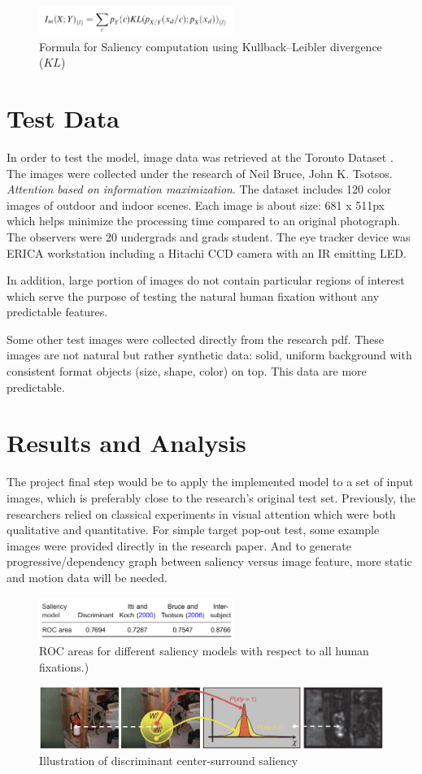 \documentclass[conference]{IEEEtran}
\begin{document}
\begin{figure}[h]
    \centering
    \includegraphics[width=2.5in]{KL.png}
    \caption{Formula for Saliency computation using Kullback–Leibler divergence ($KL$) }
    \label{fig:kl_formula}
\end{figure}

\section{Test Data}
In order to test the model, image data was retrieved at the Toronto Dataset \cite{MITBenchmark_2012}. The images were collected under the research of Neil Bruce, John K. Tsotsos. \textit{Attention based on information maximization}. The dataset includes 120 color images of outdoor and indoor scenes. Each image is about size: 681 x 511px which helps minimize the processing time compared to an original photograph. The observers were 20 undergrads and grads student. The eye tracker device was ERICA workstation including a Hitachi CCD camera with an IR emitting LED.

In addition, large portion of images do not contain particular regions of interest which serve the purpose of testing the natural human fixation without any predictable features. 

Some other test images were collected directly from the research pdf. These images are not natural but rather synthetic data: solid, uniform background with consistent format objects (size, shape, color) on top. This data are more predictable.

\section{Results and Analysis}
The project final step would be to apply the implemented model to a set of input images, which is preferably close to the research’s original test set. Previously, the researchers relied on classical experiments in visual attention which were both qualitative and quantitative. For simple target pop-out test, some example images were provided directly in the research paper. And to generate progressive/dependency graph between saliency versus image feature, more static and motion data will be needed. 

\begin{figure}[h]
    \centering
    \includegraphics[width=2.5in]{score.png}
    \caption{ROC areas for different saliency models with respect to all human fixations.) }
    \label{fig:ROCscore}
\end{figure}

\begin{figure}[h]
    \centering
    \includegraphics[width=7in]{research.png}
    \caption{ Illustration of discriminant center-surround saliency}
    \label{fig:centersurround}
\end{figure}



\end{document}
